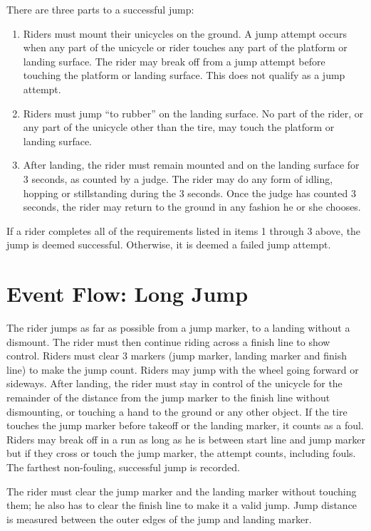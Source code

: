 There are three parts to a successful jump:
\begin{enumerate}
\item Riders must mount their unicycles on the ground.
A jump attempt occurs when any part of the unicycle or rider touches any part of the platform or landing surface.
The rider may break off from a jump attempt before touching the platform or landing surface.
This does not qualify as a jump attempt.
\item Riders must jump ``to rubber'' on the landing surface.
No part of the rider, or any part of the unicycle other than the tire, may touch the platform or landing surface.
\item After landing, the rider must remain mounted and on the landing surface for 3 seconds, as counted by a judge.
The rider may do any form of idling, hopping or stillstanding during the 3 seconds.
Once the judge has counted 3 seconds, the rider may return to the ground in any fashion he or she chooses.
\end{enumerate}
If a rider completes all of the requirements listed in items 1 through 3 above, the jump is deemed successful.
Otherwise, it is deemed a failed jump attempt.

\section{Event Flow: Long Jump}
The rider jumps as far as possible from a jump marker, to a landing without a dismount.
The rider must then continue riding across a finish line to show control.
Riders must clear 3 markers (jump marker, landing marker and finish line) to make the jump count.
Riders may jump with the wheel going forward or sideways.
After landing, the rider must stay in control of the unicycle for the remainder of the distance from the jump marker to the finish line without dismounting, or touching a hand to the ground or any other object.
If the tire touches the jump marker before takeoff or the landing marker, it counts as a foul.
Riders may break off in a run as long as he is between start line and jump marker but if they cross or touch the jump marker, the attempt counts, including fouls.
The farthest non-fouling, successful jump is recorded.

The rider must clear the jump marker and the landing marker without touching them; he also has to clear the finish line to make it a valid jump.
Jump distance is measured between the outer edges of the jump and landing marker.

